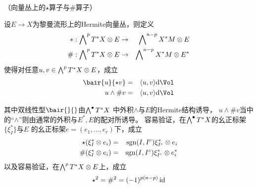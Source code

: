 
\begin{definition}（向量丛上的$\star$算子与$\#$算子）

设$E\to X$为黎曼流形上的Hermite向量丛，则定义
\begin{eqnarray*}
* :\bigwedge\nolimits^{p}T^*X\otimes E&\to&\bigwedge\nolimits^{n-p}X^*M\otimes E \\
\#:\bigwedge\nolimits^{p}T^*X\otimes E&\to&\bigwedge\nolimits^{n-p}X^*M\otimes E^*
\end{eqnarray*}
使得对任意$u,v\in \bigwedge\nolimits^{p}T^*X\otimes E$，成立
\begin{eqnarray*}
\bair{u}{\star v}&=&\pair{u}{v}\td\Vol\\
u\wedge\# v      &=&\pair{u}{v}\td\Vol
\end{eqnarray*}
\end{definition}

其中双线性型$\bair{}{}$由$\bigwedge\nolimits^{\bullet}T^*X$
中外积$\wedge$与$E$的Hermite结构诱导，
$u\wedge\# v$当中的“$\wedge$”则由通常的外积与$E^*,E$的配对所诱导。
容易验证，在$\bigwedge\nolimits^{\bullet}T^*X$的幺正标架$\{\xi_I^*\}$与$E$
的幺正标架$e=(e_1,...,e_r)$下，成立
\begin{eqnarray*}
  \star (\xi_I^*\otimes e_i) &=& \operatorname{sgn}(I,I^c)\xi_{I^c}^*\otimes e_i\\
  \#    (\xi_I^*\otimes e_i) &=& \operatorname{sgn}(I,I^c)\xi_{I^c}^*\otimes e_i^*
\end{eqnarray*}
以及容易验证，在$\bigwedge\nolimits^{p}T^*X\otimes E$上，成立
$$
  \star^2=\#^2=(-1)^{p(n-p)}\operatorname{id}
$$


